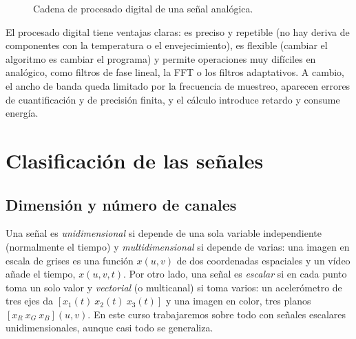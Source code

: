 \documentclass[11pt,a4paper]{scrartcl}
\begin{document}
\begin{figure}[ht]
  \centering
  \caption{Cadena de procesado digital de una señal analógica.}
  \label{fig:cadena}
\end{figure}

El procesado digital tiene ventajas claras: es preciso y repetible (no hay deriva de componentes con la temperatura o el envejecimiento), es flexible (cambiar el algoritmo es cambiar el programa) y permite operaciones muy difíciles en analógico, como filtros de fase lineal, la FFT o los filtros adaptativos. A cambio, el ancho de banda queda limitado por la frecuencia de muestreo, aparecen errores de cuantificación y de precisión finita, y el cálculo introduce retardo y consume energía.

\section{Clasificación de las señales}\label{sec:tipos}

\subsection{Dimensión y número de canales}

Una señal es \emph{unidimensional} si depende de una sola variable independiente (normalmente el tiempo) y \emph{multidimensional} si depende de varias: una imagen en escala de grises es una función $x(u,v)$ de dos coordenadas espaciales y un vídeo añade el tiempo, $x(u,v,t)$. Por otro lado, una señal es \emph{escalar} si en cada punto toma un solo valor y \emph{vectorial} (o multicanal) si toma varios: un acelerómetro de tres ejes da $[x_1(t)\ x_2(t)\ x_3(t)]$ y una imagen en color, tres planos $[x_R\ x_G\ x_B](u,v)$. En este curso trabajaremos sobre todo con señales escalares unidimensionales, aunque casi todo se generaliza.
\end{document}
